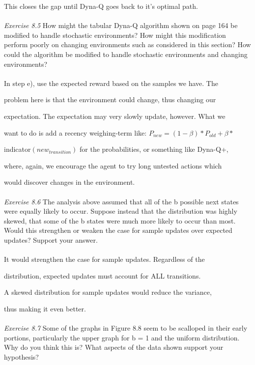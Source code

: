 \documentclass{article}
\begin{document}
This closes the gap until Dyna-Q goes back to it's optimal path. 
\\\\
\textit{Exercise 8.5} How might the tabular Dyna-Q algorithm shown on page 164 be modified
to handle stochastic environments? How might this modification perform poorly on
changing environments such as considered in this section? How could the algorithm be
modified to handle stochastic environments and changing environments? 
\\
\\

In step e), use the expected reward based on the samples we have. The 

problem here is that the environment could change, thus changing our 

expectation. The expectation may very slowly update, however. What we

want to do is add a recency weighing-term like: $P_{new} = (1 - \beta) * P_{old} + \beta *$ 

indicator$(new_{transition})$ for the probabilities, or something like Dyna-Q+,

where, again, we encourage the agent to try long untested actions which 

would discover changes in the environment.
\\\\
\textit{Exercise 8.6} The analysis above assumed that all of the b possible next states were
equally likely to occur. Suppose instead that the distribution was highly skewed, that
some of the b states were much more likely to occur than most. Would this strengthen or
weaken the case for sample updates over expected updates? Support your answer.
\\
\\

It would strengthen the case for sample updates. Regardless of the

distribution, expected updates must account for ALL transitions. 

A skewed distribution for sample updates would reduce the variance, 

thus making it even better.
\\\\
\textit{Exercise 8.7} Some of the graphs in Figure 8.8 seem to be scalloped in their early portions,
particularly the upper graph for b = 1 and the uniform distribution. Why do you think
this is? What aspects of the data shown support your hypothesis? 
\\
\\
\end{document}
